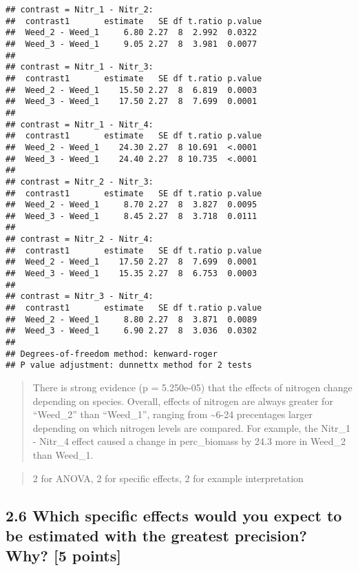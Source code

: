 \documentclass[
]{article}
\begin{document}
\begin{verbatim}
## contrast = Nitr_1 - Nitr_2:
##  contrast1       estimate   SE df t.ratio p.value
##  Weed_2 - Weed_1     6.80 2.27  8  2.992  0.0322 
##  Weed_3 - Weed_1     9.05 2.27  8  3.981  0.0077 
## 
## contrast = Nitr_1 - Nitr_3:
##  contrast1       estimate   SE df t.ratio p.value
##  Weed_2 - Weed_1    15.50 2.27  8  6.819  0.0003 
##  Weed_3 - Weed_1    17.50 2.27  8  7.699  0.0001 
## 
## contrast = Nitr_1 - Nitr_4:
##  contrast1       estimate   SE df t.ratio p.value
##  Weed_2 - Weed_1    24.30 2.27  8 10.691  <.0001 
##  Weed_3 - Weed_1    24.40 2.27  8 10.735  <.0001 
## 
## contrast = Nitr_2 - Nitr_3:
##  contrast1       estimate   SE df t.ratio p.value
##  Weed_2 - Weed_1     8.70 2.27  8  3.827  0.0095 
##  Weed_3 - Weed_1     8.45 2.27  8  3.718  0.0111 
## 
## contrast = Nitr_2 - Nitr_4:
##  contrast1       estimate   SE df t.ratio p.value
##  Weed_2 - Weed_1    17.50 2.27  8  7.699  0.0001 
##  Weed_3 - Weed_1    15.35 2.27  8  6.753  0.0003 
## 
## contrast = Nitr_3 - Nitr_4:
##  contrast1       estimate   SE df t.ratio p.value
##  Weed_2 - Weed_1     8.80 2.27  8  3.871  0.0089 
##  Weed_3 - Weed_1     6.90 2.27  8  3.036  0.0302 
## 
## Degrees-of-freedom method: kenward-roger 
## P value adjustment: dunnettx method for 2 tests
\end{verbatim}

\begin{quote}
There is strong evidence (p = 5.250e-05) that the effects of nitrogen
change depending on species. Overall, effects of nitrogen are always
greater for ``Weed\_2'' than ``Weed\_1'', ranging from
\textasciitilde6-24 precentages larger depending on which nitrogen
levels are compared. For example, the Nitr\_1 - Nitr\_4 effect caused a
change in perc\_biomass by 24.3 more in Weed\_2 than Weed\_1.
\end{quote}

\begin{quote}
2 for ANOVA, 2 for specific effects, 2 for example interpretation
\end{quote}

\hypertarget{which-specific-effects-would-you-expect-to-be-estimated-with-the-greatest-precision-why-5-points}{%
\subsection{2.6 Which specific effects would you expect to be estimated
with the greatest precision? Why? {[}5
points{]}}\label{which-specific-effects-would-you-expect-to-be-estimated-with-the-greatest-precision-why-5-points}}
\end{document}
